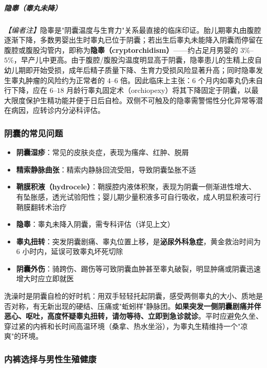 \documentclass[12pt,a4paper,twoside]{ctexbook}
\begin{document}
\subparagraph{隐睾（睾丸未降）}

\noindent\textit{【编者注】}隐睾是"阴囊温度与生育力"关系最直接的临床印证。胎儿期睾丸由腹腔逐渐下降，多数男婴出生时睾丸已位于阴囊；若出生后睾丸未能降入阴囊而停留在腹腔或腹股沟管内，即称为\textbf{隐睾（cryptorchidism）}——约占足月男婴的 $3\%$--$5\%$，早产儿中更高。由于腹腔/腹股沟温度明显高于阴囊，隐睾患儿的生精上皮自幼儿期即开始受损，成年后精子质量下降、生育力受损风险显著升高；同时隐睾发生睾丸肿瘤的风险约为正常者的 $4$--$6$ 倍。因此临床上主张：$6$ 个月内如睾丸仍未自行下降，应在 $6$--$18$ 月龄行睾丸固定术（orchiopexy）将其下降固定于阴囊，以最大限度保护生精功能并便于日后自检。双侧不可触及的隐睾需警惕性分化异常等潜在病因，应转诊内分泌科评估。

\subsubsection{阴囊的常见问题}

\begin{itemize}
    \item \textbf{阴囊湿疹}：常见的皮肤炎症，表现为瘙痒、红肿、脱屑
    \item \textbf{精索静脉曲张}：精索内静脉回流受阻，导致阴囊坠胀不适
    \item \textbf{鞘膜积液（hydrocele）}：鞘膜腔内液体积聚，表现为阴囊一侧渐进性增大、有坠胀感，透光试验阳性；婴儿期少量积液多可自行吸收，成人明显积液可行鞘膜翻转术治疗
    \item \textbf{隐睾}：睾丸未降入阴囊，需专科评估（详见上文）
    \item \textbf{睾丸扭转}：突发阴囊剧痛、睾丸位置上移，是\textbf{泌尿外科急症}，黄金救治时间为 $6$ 小时内，延误可致睾丸坏死切除
    \item \textbf{阴囊外伤}：骑跨伤、踢伤等可致阴囊血肿甚至睾丸破裂，明显肿痛或阴囊迅速增大时应立即就医
\end{itemize}

\begin{tcolorbox}[colback=pink!5!white,colframe=red!50!black,title=贴心小叮咛]
洗澡时是阴囊自检的好时机：用双手轻轻托起阴囊，感受两侧睾丸的大小、质地是否对称，有无新出现的硬结、压痛或"蚯蚓样"静脉团。\textbf{如果突发一侧阴囊剧痛并伴恶心、呕吐，高度怀疑睾丸扭转，请勿等待、立即到急诊就诊}。平时应避免久坐、穿过紧的内裤和长时间高温环境（桑拿、热水坐浴），为睾丸生精维持一个"凉爽"的环境。
\end{tcolorbox}

\subsubsection{内裤选择与男性生殖健康}
\end{document}
